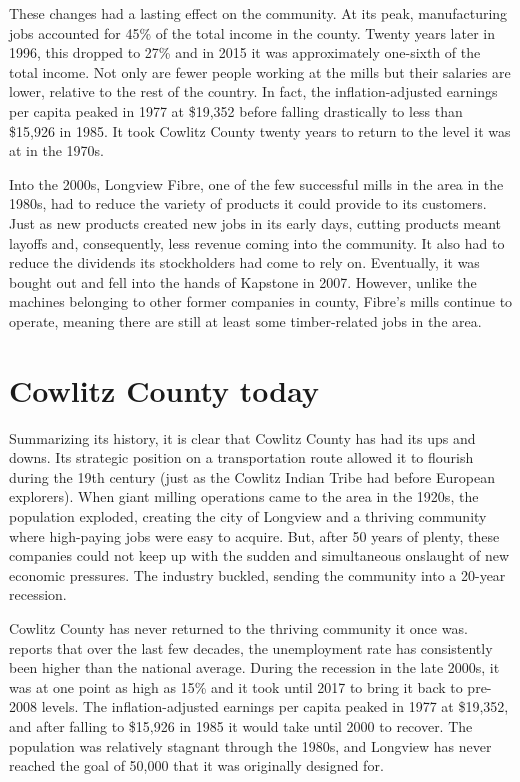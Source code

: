 These changes had a lasting effect on the community. At its peak, manufacturing jobs accounted for 45\% of the total income in the county. Twenty years later in 1996, this dropped to 27\% and in 2015 it was approximately one-sixth of the total income. Not only are fewer people working at the mills but their salaries are lower, relative to the rest of the country. In fact, the inflation-adjusted earnings per capita peaked in 1977 at \$19,352 before falling drastically to less than \$15,926 in 1985. It took Cowlitz County twenty years to return to the level it was at in the 1970s.

Into the 2000s, Longview Fibre, one of the few successful mills in the area in the 1980s, had to reduce the variety of products it could provide to its customers. Just as new products created new jobs in its early days, cutting products meant layoffs and, consequently, less revenue coming into the community. It also had to reduce the dividends its stockholders had come to rely on. Eventually, it was bought out and fell into the hands of Kapstone in 2007. However, unlike the machines belonging to other former companies in county, Fibre's mills continue to operate, meaning there are still at least some timber-related jobs in the area.





\section{Cowlitz County today}

Summarizing its history, it is clear that Cowlitz County has had its ups and downs. Its strategic position on a transportation route allowed it to flourish during the 19th century (just as the Cowlitz Indian Tribe had before European explorers). When giant milling operations came to the area in the 1920s, the population exploded, creating the city of Longview and a thriving community where high-paying jobs were easy to acquire. But, after 50 years of plenty, these companies could not keep up with the sudden and simultaneous onslaught of new economic pressures. The industry buckled, sending the community into a 20-year recession.

Cowlitz County has never returned to the thriving community it once was. \citet{bailey_2016} reports that over the last few decades, the unemployment rate has consistently been higher than the national average. During the recession in the late 2000s, it was at one point as high as 15\% and it took until 2017 to bring it back to pre-2008 levels. The inflation-adjusted earnings per capita peaked in 1977 at \$19,352, and after falling to \$15,926 in 1985 it would take until 2000 to recover. The population was relatively stagnant through the 1980s, and Longview has never reached the goal of 50,000 that it was originally designed for.

